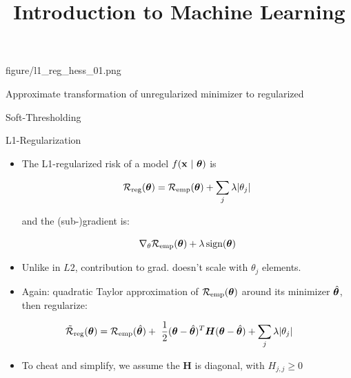 \documentclass[11pt,compress,t,notes=noshow, xcolor=table]{beamer}
\title{Introduction to Machine Learning}
\begin{document}
{figure/l1_reg_hess_01.png}{
    \item Approximate transformation of unregularized minimizer to regularized 
    \item Soft-Thresholding
}

\begin{vbframe} {L1-Regularization}
  

  \begin{itemize}
    \item The L1-regularized risk of a model $f(\mathbf{x} ~|~ \bm{\theta})$ is

      \[
     \mathcal{R}_{\text{reg}}(\bm{\theta}) = \mathcal{R}_{\text{emp}}(\bm{\theta}) + \sum_j \lambda |\theta_j|
      \] 
      
      and the (sub-)gradient is:
      
      
      $$ \nabla_{\theta} \mathcal{R}_{\text{emp}}(\bm{\theta}) + \lambda \operatorname{sign}(\bm{\theta}) $$

    \item Unlike in $L2$, contribution to grad. doesn't scale with $\theta_j$ elements. 
    \item Again: quadratic Taylor approximation of $\mathcal{R}_{\text{emp}}(\bm{\theta})$ around its minimizer $\hat{\bm{\theta}}$, then regularize:
  \end{itemize}

 $$\mathcal{\tilde R}_{\text{reg}}(\bm{\theta}) = \mathcal{R}_{\text{emp}}(\hat{\bm{\theta}}) +\ \frac{1}{2} (\bm{\theta} - \hat{\bm{\theta}})^T \bm{H} (\bm{\theta} - \hat{\bm{\theta}})  + \sum_j \lambda |\theta_j|$$
  
  \framebreak
  
  \begin{itemize}

\item To cheat and simplify, we assume the $\bm{H}$ is diagonal, with $H_{j,j} \geq 0$
  

\end{itemize}
\end{vbframe}
\end{document}
